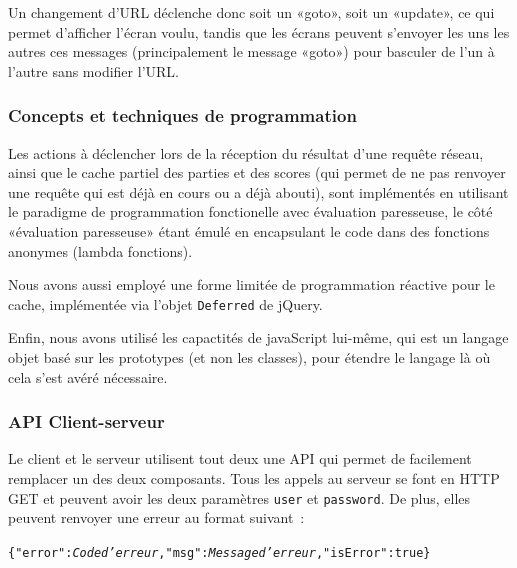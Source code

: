 \documentclass[a4paper,11pt,french]{article}
\begin{document}
Un changement d'URL déclenche donc soit un «goto», soit un «update», ce qui permet d'afficher l'écran voulu, tandis que les écrans peuvent
s'envoyer les uns les autres ces messages (principalement le message «goto») pour basculer de l'un à l'autre sans modifier l'URL.

\subsubsection{Concepts et techniques de programmation}

Les actions à déclencher lors de la réception du résultat d'une requête réseau, ainsi que le cache partiel des parties et des scores (qui
permet de ne pas renvoyer une requête qui est déjà en cours ou a déjà abouti), sont implémentés en utilisant le paradigme de programmation
fonctionelle avec évaluation paresseuse, le côté «évaluation paresseuse» étant émulé en encapsulant le code dans des fonctions anonymes
(lambda fonctions).

Nous avons aussi employé une forme limitée de programmation réactive pour le cache, implémentée via l'objet \verb!Deferred! de jQuery.

Enfin, nous avons utilisé les capactités de javaScript lui-même, qui est un langage objet basé sur les prototypes (et non les classes), pour
étendre le langage là où cela s'est avéré nécessaire.

\subsubsection{API Client-serveur}
Le client et le serveur utilisent tout deux une API qui permet de facilement remplacer un des deux composants. Tous les appels au serveur se font en HTTP GET et peuvent avoir les deux paramètres \verb!user! et \verb!password!. De plus, elles peuvent renvoyer une erreur au format suivant~:
\begin{alltt}
\{"error":\textit{Code d'erreur}, "msg":\textit{Message d'erreur}, "isError":true\}
\end{alltt}
\end{document}
